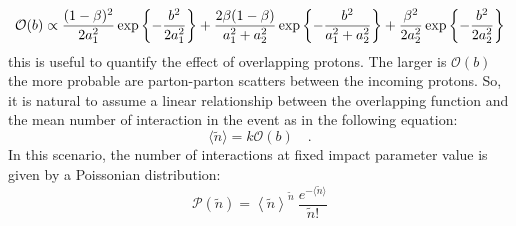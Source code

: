 \begin{equation}
\small{
	\mathcal{O}(b)\propto \frac{(1-\beta)^2}{2a_1^2}\exp\left\{-\frac{b^2}{2a_1^2}\right\}+\frac{2\beta(1-\beta)}{a_1^2+a_2^2}\exp\left\{ -\frac{b^2}{a_1^2+a_2^2} \right\}+\frac{\beta^2}{2a_2^2}\exp\left\{-\frac{b^2}{2a_2^2}\right\}
	}
\end{equation}
this is useful to quantify the effect of overlapping protons.
The larger is $\mathcal{O}(b)$ the more probable are parton-parton scatters between the incoming protons. So, it is natural to assume a linear relationship between the overlapping function and the mean number of interaction in the event as in the following equation: 
\begin{equation}
\langle \widetilde{n} \rangle = k \mathcal{O}(b)\quad.
\end{equation}
In this scenario, the number of interactions at fixed impact parameter value is given by a Poissonian distribution:
\begin{equation}
\mathcal{P}(\widetilde{n})=
	\left\langle \widetilde{n}\right\rangle ^{\widetilde{n}}\ \frac{e^{-\langle\widetilde{n}\rangle}}{\widetilde{n}!}
	\label{eq:poisson}
\end{equation} 

